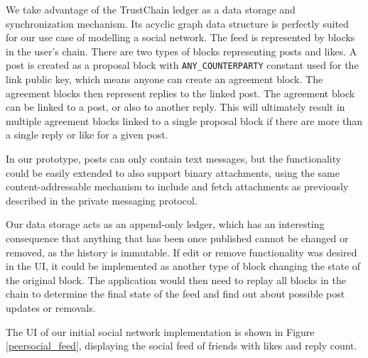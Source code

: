 We take advantage of the TrustChain ledger as a data storage and synchronization mechanism. Its acyclic graph data structure is perfectly suited for our use case of modelling a social network. The feed is represented by blocks in the user's chain. There are two types of blocks representing posts and likes. A post is created as a proposal block with \texttt{ANY\_COUNTERPARTY} constant used for the link public key, which means anyone can create an agreement block. The agreement blocks then represent replies to the linked post. The agreement block can be linked to a post, or also to another reply. This will ultimately result in multiple agreement blocks linked to a single proposal block if there are more than a single reply or like for a given post.

In our prototype, posts can only contain text messages, but the functionality could be easily extended to also support binary attachments, using the same content-addressable mechanism to include and fetch attachments as previously described in the private messaging protocol.

Our data storage acts as an append-only ledger, which has an interesting consequence that anything that has been once published cannot be changed or removed, as the history is immutable. If edit or remove functionality was desired in the UI, it could be implemented as another type of block changing the state of the original block. The application would then need to replay all blocks in the chain to determine the final state of the feed and find out about possible post updates or removals.

The UI of our initial social network implementation is shown in Figure \ref{peersocial_feed}, displaying the social feed of friends with likes and reply count.

